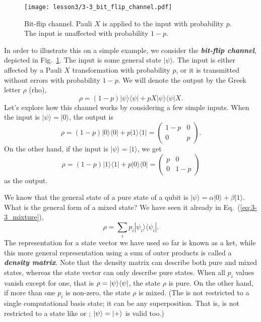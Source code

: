 \begin{figure}[t]
    \centering
    \texttt{[image: lesson3/3-3\_bit\_flip\_channel.pdf]}
    \caption[Bit-flip channel.]{Bit-flip channel. Pauli $X$ is applied to the input with probability $p$. The input is unaffected with probability $1-p$.}
    \label{fig:3-3_bit_flip_channel}
\end{figure}
In order to illustrate this on a simple example, we consider the  \textbf{\emph{bit-flip channel}}, depicted in Fig.~\ref{fig:3-3_bit_flip_channel}.
The input is some general state $|\psi\rangle$.
The input is either affected by a Pauli $X$ transformation with probability $p$, or it is transmitted without errors with probability $1-p$.
We will denote the output by the Greek letter $\rho$ (rho),
\begin{equation}
    \rho = (1-p) |\psi\rangle\langle\psi| + p X|\psi\rangle\langle\psi|X.
    \label{eq:3-3_bit_flip}
\end{equation}
Let's explore how this channel works by considering a few simple inputs.
When the input is $|\psi\rangle = |0\rangle$, the output is
\begin{equation}
    \rho = (1-p)|0\rangle\langle0| + p|1\rangle\langle1| = \begin{pmatrix} 1-p & 0 \\ 0 & p \end{pmatrix}.
\end{equation}
On the other hand, if the input is $|\psi\rangle=|1\rangle$, we get
\begin{equation}
    \rho = (1-p)|1\rangle\langle1| + p|0\rangle\langle0| = \begin{pmatrix} p & 0 \\ 0 & 1-p \end{pmatrix}
\end{equation}
as the output.

We know that the general state of a pure state of a qubit is $|\psi\rangle = \alpha|0\rangle + \beta|1\rangle$.
What is the general form of a mixed state?
We have seen it already in Eq.~(\ref{eq:3-3_mixture}),
\begin{equation}
    \rho = \sum_i p_i |\psi_i\rangle\langle\psi_i|.
    \label{eq:general_mixed_state}
\end{equation}
The representation for a state vector we have used so far is known as a ket, while this more general representation using a sum of outer products is called a \textbf{\emph{density matrix}}.
Note that the density matrix can describe both pure and mixed states, whereas the state vector can only describe pure states.
When all $p_i$ values vanish except for one, that is $\rho=|\psi \rangle \langle \psi|$, the state $\rho$ is pure.
On the other hand, if more than one $p_i$ is non-zero, the state $\rho$ is mixed.  (The \ket{\psi} is not restricted to a single computational basis state; it can be any superposition.  That is, \ket{\psi} is not restricted to a state like  or ; $\left| \psi \right\rangle = \left| + \right\rangle$ is valid too.)

